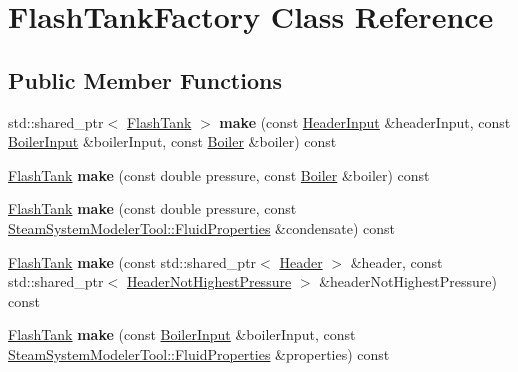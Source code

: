 \hypertarget{class_flash_tank_factory}{}\section{Flash\+Tank\+Factory Class Reference}
\label{class_flash_tank_factory}
\subsection*{Public Member Functions}
\begin{DoxyCompactItemize}
\item 
\mbox{\label{class_flash_tank_factory_aa67e8b1c9a1d20614616bd6ce29706b2}} 
std\+::shared\+\_\+ptr$<$ \hyperlink{class_flash_tank}{Flash\+Tank} $>$ {\bfseries make} (const \hyperlink{class_header_input}{Header\+Input} \&header\+Input, const \hyperlink{class_boiler_input}{Boiler\+Input} \&boiler\+Input, const \hyperlink{class_boiler}{Boiler} \&boiler) const
\item 
\mbox{\label{class_flash_tank_factory_a068b5e4eb6ad0390fb93817e0b9890f5}} 
\hyperlink{class_flash_tank}{Flash\+Tank} {\bfseries make} (const double pressure, const \hyperlink{class_boiler}{Boiler} \&boiler) const
\item 
\mbox{\label{class_flash_tank_factory_aceaed241ae5afb2b626c47d83c18f4e3}} 
\hyperlink{class_flash_tank}{Flash\+Tank} {\bfseries make} (const double pressure, const \hyperlink{struct_steam_system_modeler_tool_1_1_fluid_properties}{Steam\+System\+Modeler\+Tool\+::\+Fluid\+Properties} \&condensate) const
\item 
\mbox{\label{class_flash_tank_factory_a5daa9bc5b88ff891aa1b7db0723f5980}} 
\hyperlink{class_flash_tank}{Flash\+Tank} {\bfseries make} (const std\+::shared\+\_\+ptr$<$ \hyperlink{class_header}{Header} $>$ \&header, const std\+::shared\+\_\+ptr$<$ \hyperlink{class_header_not_highest_pressure}{Header\+Not\+Highest\+Pressure} $>$ \&header\+Not\+Highest\+Pressure) const
\item 
\mbox{\label{class_flash_tank_factory_a7b4ce87e0835a859903e182efe211af1}} 
\hyperlink{class_flash_tank}{Flash\+Tank} {\bfseries make} (const \hyperlink{class_boiler_input}{Boiler\+Input} \&boiler\+Input, const \hyperlink{struct_steam_system_modeler_tool_1_1_fluid_properties}{Steam\+System\+Modeler\+Tool\+::\+Fluid\+Properties} \&properties) const

\end{DoxyCompactItemize}
